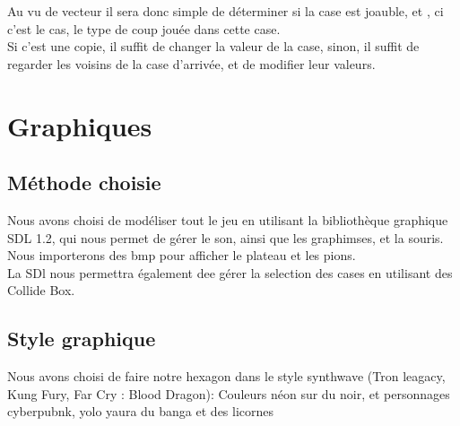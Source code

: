 \documentclass{report}
\begin{document}
	Au vu de vecteur il sera donc simple de déterminer si la case est joauble, et , ci c'est le cas, le type de coup jouée dans cette case.\\
	Si c'est une copie, il suffit de changer la valeur de la case, sinon,  il suffit de regarder les voisins de la case d'arrivée, et de modifier leur valeurs.

\section{Graphiques}
	\subsection{Méthode choisie}
	
		Nous avons choisi de modéliser tout le jeu en utilisant la bibliothèque graphique SDL 1.2, qui nous permet de gérer le son, ainsi que les graphimses, et la souris. Nous importerons des bmp pour afficher le plateau et les pions.\\
		
		La SDl nous permettra également dee gérer la selection des cases en utilisant des Collide Box. 
	
	
	\subsection{Style graphique}
	
		Nous avons choisi de faire notre hexagon dans le style synthwave (Tron leagacy, Kung Fury, Far Cry : Blood Dragon): Couleurs néon sur du noir, et personnages cyberpubnk, yolo yaura du banga et des licornes
\end{document}
